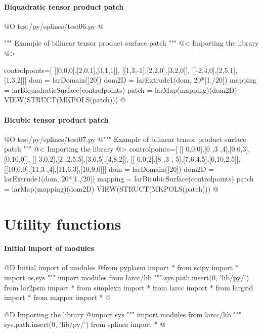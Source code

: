 \documentclass[11pt,oneside]{article}	%
\begin{document}
\paragraph{Biquadratic tensor product patch}

@O test/py/splines/test06.py
@{""" Example of bilinear tensor product surface patch """
@< Importing the library @>

controlpoints=[
	[[0,0,0],[2,0,1],[3,1,1]],
	[[1,3,-1],[2,2,0],[3,2,0]],
	[[-2,4,0],[2,5,1],[1,3,2]]]
dom = larDomain([20])
dom2D = larExtrude1(dom, 20*[1./20])
mapping = larBiquadraticSurface(controlpoints)
patch = larMap(mapping)(dom2D)
VIEW(STRUCT(MKPOLS(patch)))
@}


\paragraph{Bicubic tensor product patch}

@O test/py/splines/test07.py
@{""" Example of bilinear tensor product surface patch """
@< Importing the library @>
controlpoints=[
	[[ 0,0,0],[0 ,3  ,4],[0,6,3],[0,10,0]],
	[[ 3,0,2],[2 ,2.5,5],[3,6,5],[4,8,2]],
	[[ 6,0,2],[8 ,3 , 5],[7,6,4.5],[6,10,2.5]],
	[[10,0,0],[11,3  ,4],[11,6,3],[10,9,0]]]
dom = larDomain([20])
dom2D = larExtrude1(dom, 20*[1./20])
mapping = larBicubicSurface(controlpoints)
patch = larMap(mapping)(dom2D)
VIEW(STRUCT(MKPOLS(patch)))
@}



\appendix
\section{Utility functions}

\paragraph{Initial import of modules}

@D Initial import of modules
@{from pyplasm import *
from scipy import *
import os,sys
""" import modules from larcc/lib """
sys.path.insert(0, 'lib/py/')
from lar2psm import *
from simplexn import *
from larcc import *
from largrid import *
from mapper import *
@}


@D Importing the library
@{import sys
""" import modules from larcc/lib """
sys.path.insert(0, 'lib/py/') 
from splines import *
@}




\end{document}
